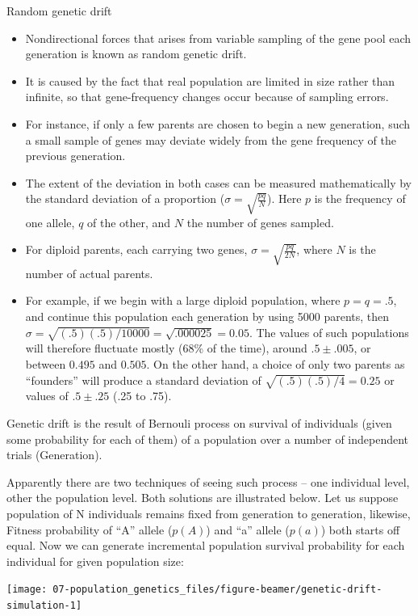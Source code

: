 \documentclass[11pt,dvipsnames,ignorenonframetext,aspectratio=169]{beamer}
\providecommand{\tightlist}{%
  \setlength{\itemsep}{0pt}\setlength{\parskip}{0pt}}
\begin{document}
\begin{frame}{Random genetic drift}
\protect\hypertarget{random-genetic-drift}{}
\small

\begin{itemize}
\tightlist
\item
  Nondirectional forces that arises from variable sampling of the gene
  pool each generation is known as random genetic drift.
\item
  It is caused by the fact that real population are limited in size
  rather than infinite, so that gene-frequency changes occur because of
  sampling errors.
\item
  For instance, if only a few parents are chosen to begin a new
  generation, such a small sample of genes may deviate widely from the
  gene frequency of the previous generation.
\item
  The extent of the deviation in both cases can be measured
  mathematically by the standard deviation of a proportion
  (\(\sigma = \sqrt{\frac{pq}{N}}\)). Here \(p\) is the frequency of one
  allele, \(q\) of the other, and \(N\) the number of genes sampled.
\item
  For diploid parents, each carrying two genes,
  \(\sigma = \sqrt{\frac{pq}{2N}}\), where \(N\) is the number of actual
  parents.
\item
  For example, if we begin with a large diploid population, where
  \(p = q = .5\), and continue this population each generation by using
  5000 parents, then
  \(\sigma = \sqrt{(.5)(.5)/10000} = \sqrt{.000025} = 0.05\). The values
  of such populations will therefore fluctuate mostly (68\% of the
  time), around \(.5 \pm .005\), or between \(0.495\) and \(0.505\). On
  the other hand, a choice of only two parents as ``founders'' will
  produce a standard deviation of \(\sqrt{(.5)(.5)/4} = 0.25\) or values
  of \(.5 \pm .25\) (.25 to .75).
\end{itemize}
\end{frame}

\begin{frame}{}
\protect\hypertarget{section-22}{}
\footnotesize

Genetic drift is the result of Bernouli process on survival of
individuals (given some probability for each of them) of a population
over a number of independent trials (Generation).

Apparently there are two techniques of seeing such process -- one
individual level, other the population level. Both solutions are
illustrated below. Let us suppose population of N individuals remains
fixed from generation to generation, likewise, Fitness probability of
``A'' allele (\(p(A)\)) and ``a'' allele (\(p(a)\)) both starts off
equal. Now we can generate incremental population survival probability
for each individual for given population size:

\texttt{[image: 07-population\_genetics\_files/figure-beamer/genetic-drift-simulation-1]}
\end{frame}
\end{document}
